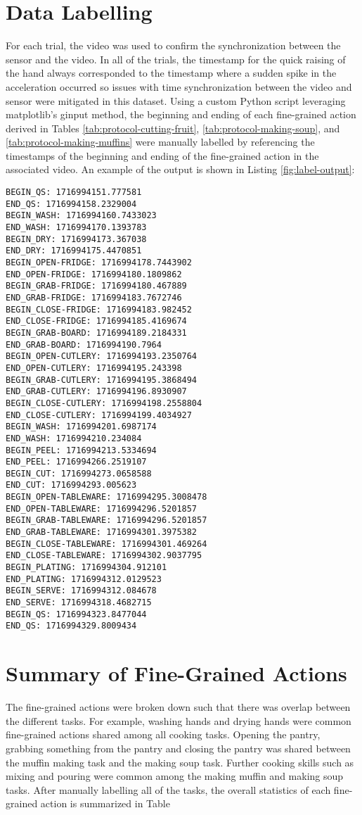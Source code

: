 \section{Data Labelling}
For each trial, the video was used to confirm the synchronization between the sensor and the video. In all of the trials, the timestamp for the quick raising of the hand always corresponded to the timestamp where a sudden spike in the acceleration occurred so issues with time synchronization between the video and sensor were mitigated in this dataset. Using a custom Python script leveraging matplotlib's ginput method, the beginning and ending of each fine-grained action derived in Tables \ref{tab:protocol-cutting-fruit}, \ref{tab:protocol-making-soup}, and \ref{tab:protocol-making-muffins} were manually labelled by referencing the timestamps of the beginning and ending of the fine-grained action in the associated video. An example of the output is shown in Listing \ref{fig:label-output}:


\begin{lstlisting}[label=fig:label-output, caption=Manual labelling output for the cutting fruit task.]
BEGIN_QS: 1716994151.777581
END_QS: 1716994158.2329004
BEGIN_WASH: 1716994160.7433023
END_WASH: 1716994170.1393783
BEGIN_DRY: 1716994173.367038
END_DRY: 1716994175.4470851
BEGIN_OPEN-FRIDGE: 1716994178.7443902
END_OPEN-FRIDGE: 1716994180.1809862
BEGIN_GRAB-FRIDGE: 1716994180.467889
END_GRAB-FRIDGE: 1716994183.7672746
BEGIN_CLOSE-FRIDGE: 1716994183.982452
END_CLOSE-FRIDGE: 1716994185.4169674
BEGIN_GRAB-BOARD: 1716994189.2184331
END_GRAB-BOARD: 1716994190.7964
BEGIN_OPEN-CUTLERY: 1716994193.2350764
END_OPEN-CUTLERY: 1716994195.243398
BEGIN_GRAB-CUTLERY: 1716994195.3868494
END_GRAB-CUTLERY: 1716994196.8930907
BEGIN_CLOSE-CUTLERY: 1716994198.2558804
END_CLOSE-CUTLERY: 1716994199.4034927
BEGIN_WASH: 1716994201.6987174
END_WASH: 1716994210.234084
BEGIN_PEEL: 1716994213.5334694
END_PEEL: 1716994266.2519107
BEGIN_CUT: 1716994273.0658588
END_CUT: 1716994293.005623
BEGIN_OPEN-TABLEWARE: 1716994295.3008478
END_OPEN-TABLEWARE: 1716994296.5201857
BEGIN_GRAB-TABLEWARE: 1716994296.5201857
END_GRAB-TABLEWARE: 1716994301.3975382
BEGIN_CLOSE-TABLEWARE: 1716994301.469264
END_CLOSE-TABLEWARE: 1716994302.9037795
BEGIN_PLATING: 1716994304.912101
END_PLATING: 1716994312.0129523
BEGIN_SERVE: 1716994312.084678
END_SERVE: 1716994318.4682715
BEGIN_QS: 1716994323.8477044
END_QS: 1716994329.8009434
\end{lstlisting}

\clearpage
\section{Summary of Fine-Grained Actions}
The fine-grained actions were broken down such that there was overlap between the different tasks. For example, washing hands and drying hands were common fine-grained actions shared among all cooking tasks. Opening the pantry, grabbing something from the pantry and closing the pantry was shared between the muffin making task and the making soup task. Further cooking skills such as mixing and pouring were common among the making muffin and making soup tasks. After manually labelling all of the tasks, the overall statistics of each fine-grained action is summarized in Table


